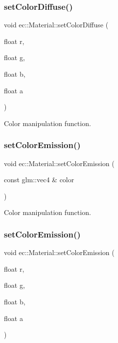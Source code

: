 \subsubsection{\texorpdfstring{set\+Color\+Diffuse()}{setColorDiffuse()}\hspace{0.1cm}{\footnotesize\ttfamily [2/2]}}
{\footnotesize\ttfamily void ec\+::\+Material\+::set\+Color\+Diffuse (\begin{DoxyParamCaption}\item[{float}]{r,  }\item[{float}]{g,  }\item[{float}]{b,  }\item[{float}]{a }\end{DoxyParamCaption})}



Color manipulation function. 

\mbox{\label{classec_1_1_material_a77ac7702af54e4c8a7301387bea159dd}} 
\subsubsection{\texorpdfstring{set\+Color\+Emission()}{setColorEmission()}\hspace{0.1cm}{\footnotesize\ttfamily [1/2]}}
{\footnotesize\ttfamily void ec\+::\+Material\+::set\+Color\+Emission (\begin{DoxyParamCaption}\item[{const glm\+::vec4 \&}]{color }\end{DoxyParamCaption})}



Color manipulation function. 

\mbox{\label{classec_1_1_material_a6fa0dfb1c76b2c9b07fbd2b28021010c}} 
\subsubsection{\texorpdfstring{set\+Color\+Emission()}{setColorEmission()}\hspace{0.1cm}{\footnotesize\ttfamily [2/2]}}
{\footnotesize\ttfamily void ec\+::\+Material\+::set\+Color\+Emission (\begin{DoxyParamCaption}\item[{float}]{r,  }\item[{float}]{g,  }\item[{float}]{b,  }\item[{float}]{a }\end{DoxyParamCaption})}



